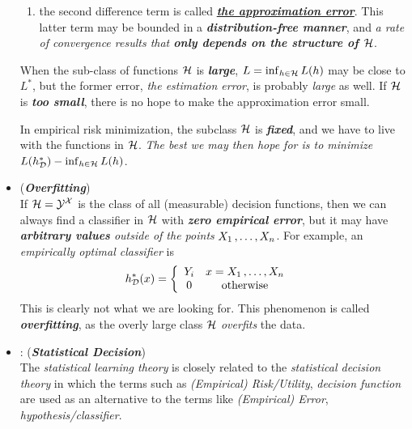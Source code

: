 \documentclass[11pt]{article}
\begin{document}
\begin{itemize}
\begin{remark}
\begin{enumerate}
\item the second difference term is called \underline{\emph{\textbf{the approximation error}}}. This latter term may be bounded in a \emph{\textbf{distribution-free manner}}, and \emph{a rate of convergence results that \textbf{only depends on the structure of ${\mathcal H}$}}.
\end{enumerate}

When the sub-class of functions ${\mathcal H}$ is \emph{\textbf{large}}, $L = \inf_{h \in {\mathcal H}}L(h)$ may be close to $L^{*}$, but the former error, \emph{the estimation error}, is probably \emph{large} as well.  If ${\mathcal H}$ is \emph{\textbf{too small}}, there is no hope to make the approximation error small.

 In empirical risk minimization, the subclass ${\mathcal H}$ is \emph{\textbf{fixed}}, and we have to live with the functions in ${\mathcal H}$. \emph{The best we may then
hope for is to minimize $L(h_{{\mathcal D}}^{*}) - \inf_{h \in {\mathcal H}}L(h)$}. 
\end{remark}

\item \begin{remark} (\emph{\textbf{Overfitting}})\\
If ${\mathcal H} = {\mathcal Y}^{{\mathcal X}}$ is the class of all (measurable) decision functions, then we can always find a classifier in ${\mathcal H}$ with \emph{\textbf{zero empirical error}}, but it may have \emph{\textbf{arbitrary values} outside of the points} $X_1 \,{,}\ldots{,}\, X_n$. For example, an \emph{empirically optimal classifier} is
\begin{align*}
h_{{\mathcal D}}^{*}(x) &= \left\{ \begin{array}{cc}
Y_i & x = X_1 \,{,}\ldots{,}\, X_n\\
0 & \text{otherwise}
\end{array}
\right.
\end{align*} This is clearly not what we are looking for. This phenomenon is called \emph{\textbf{overfitting}}, as the overly large class ${\mathcal H}$ \emph{overfits} the data. 
\end{remark}

\item \begin{remark}: (\emph{\textbf{Statistical Decision}}) \citep{berger2013statistical}\\
The \emph{statistical learning theory} is closely related to the \emph{statistical decision theory} in which the terms such as  \emph{(Empirical) Risk/Utility}, \emph{decision function} are used as an alternative to the terms like \emph{(Empirical) Error}, \emph{hypothesis/classifier}. 
\end{remark}
\end{itemize}
\end{document}
